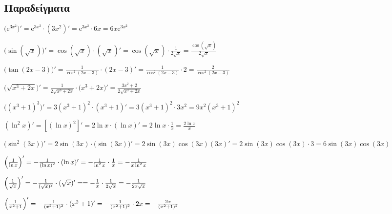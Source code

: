   \subsection*{Παραδείγματα}

  \begin{example}
    $ \bigl(\mathrm{e}^{3x^{2}}\bigr)' = \mathrm{e}^{3x^{2}} \cdot (3x^{2})' =
    \mathrm{e}^{3x^{2}} \cdot 6x = 6x \mathrm{e}^{3x^{2}} $
  \end{example}
  \begin{example}
    $ \bigl(\sin{(\sqrt{x})} \bigr)' = \cos{(\sqrt{x})} \cdot (\sqrt{x})' =
    \cos{(\sqrt{x})} \cdot \frac{1}{2 \sqrt{x}} = \frac{\cos{(\sqrt{x})}}{2 \sqrt{x}} $
  \end{example}
  \begin{example}
    $ \bigl(\tan{(2x-3)}\bigr)' = \frac{1}{\cos^{2}{(2x-3)}} \cdot (2x-3)' =
    \frac{1}{\cos^{2}{(2x-3)}} \cdot 2 = \frac{2}{\cos^{2}{(2x-3)}} $
  \end{example}
  \begin{example}
    $ \bigl(\sqrt{x^{3}+2x}\bigr)' = \frac{1}{2 \sqrt{x^{3}+2x}} 
    \cdot \bigl(x^{3}+2x\bigr)' = \frac{3x^{2}+2}{2 \sqrt{x^{3}+2x}} $
  \end{example}
  \begin{example}
    $ \bigl((x^{3}+1)^{3}\bigr)' = 3 (x^{3}+1)^{2} \cdot (x^{3}+1)' = 3 (x^{3}+1)^{2}
    \cdot 3x^{2} = 9 x^{2} (x^{3}+1)^{2} $
  \end{example}
  \begin{example}
    $ (\ln^{2}x)' = [(\ln{x} )^{2}]' = 2 \ln{x} \cdot (\ln{x} )' = 2 \ln{x} \cdot
    \frac{1}{x} = \frac{2 \ln{x}}{x} $
  \end{example}
  \begin{example}
    $ \bigl(\sin^{2}{(3x)}\bigr)' \! = 2 \sin{(3x)} \cdot \bigl(\sin{(3x)}\bigr)' 
    \! = 2 \sin{(3x)} \cos{(3x)} (3x)' 
    \! = 2 \sin{(3x)} \cos{(3x)} \cdot 3 
    \! = 6 \sin{(3x)} \cos{(3x)} \!\! $
  \end{example}
  \begin{example}
    $ \Bigl(\frac{1}{\ln{x}} \Bigr)' = - \frac{1}{(\ln{x} )^{2}} \cdot (\ln{x} )' 
    = - \frac{1}{\ln^{2}{x}} \cdot \frac{1}{x} = - \frac{1}{x \ln^{2}{x}} $ 
  \end{example}
  \begin{example}
    $ \Bigl(\frac{1}{\sqrt{x}}\Bigr)' = - \frac{1}{(\sqrt{x} )^{2}} \cdot (\sqrt{x})' = 
    = - \frac{1}{x} \cdot \frac{1}{2 \sqrt{x}} = - \frac{1}{2 x \sqrt{x}} $
  \end{example}
  \begin{example}
    $ \Bigl(\frac{1}{x^{2}+1} \Bigr)' = - \frac{1}{(x^{2}+1)^{2}} \cdot (x^{2}+1)' = 
    - \frac{1}{(x^{2}+1)^{2}} \cdot 2x = - \frac{2x}{(x^{2}+1)^{2}} $ 
  \end{example}

